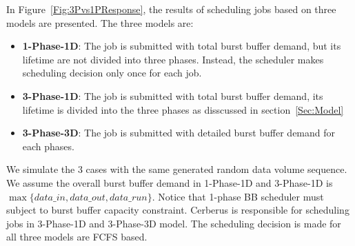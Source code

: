 In Figure~\ref{Fig:3Pvs1PResponse}, the results of scheduling jobs based on three models
are presented. The three models are:
\begin{itemize}
        \item \textbf{1-Phase-1D}: The job is submitted with total burst buffer demand, 
        but its lifetime are not divided into three phases. 
	Instead, the scheduler makes scheduling decision only once for each job.

        \item \textbf{3-Phase-1D}: The job is submitted with total burst buffer demand,
        its lifetime is divided into the three phases as disscussed in section~\ref{Sec:Model}
        
        \item \textbf{3-Phase-3D}: The job is submitted with detailed burst buffer demand for each phases.
\end{itemize}
We simulate the 3 cases with the same generated random data volume sequence.
We assume the overall burst buffer demand in 1-Phase-1D and 3-Phase-1D is
$\max \{data\_in, data\_out, data\_run\}$.
Notice that 1-phase BB scheduler must subject to burst buffer capacity constraint.
Cerberus is responsible for scheduling jobs in 3-Phase-1D and 3-Phase-3D model.
The scheduling decision is made for all three models are FCFS based.

% 


